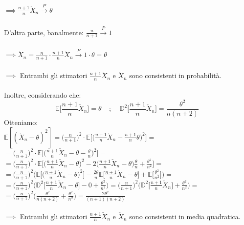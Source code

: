 \documentclass{article}
\begin{document}
$\implies \frac{n+1}{n}\check{X}_{n} \xrightarrow[]{P} \theta$\\ \\
D'altra parte, banalmente: $\frac{n}{n+1} \xrightarrow[]{P} 1$\\ \\
$\implies \check{X}_{n} = \frac{n}{n+1} \cdot \frac{n+1}{n}\check{X}_{n} \xrightarrow[]{P} 1\cdot \theta = \theta$\\ \\
$\implies$ Entrambi gli stimatori $\frac{n+1}{n}\check{X}_{n}$ e $\check{X}_{n}$ sono consistenti in probabilità.\\
\\
Inoltre, considerando che:
\[ \mathbb{E}\Big[\frac{n+1}{n}\check{X}_{n}\Big] = \theta \; \; \; \; ; \; \; \; \; \mathbb{D}^{2}\Big[\frac{n+1}{n}\check{X}_{n}\Big] = \frac{\theta^{2}}{n(n+2)} \]
Otteniamo:\\
$\mathbb{E}[(\check{X}_{n} - \theta)^{2}] = \Big(\frac{n}{n+1}\Big)^{2} \cdot \mathbb{E}\Big[\Big(\frac{n+1}{n}\check{X}_{n} - \frac{n+1}{n}\theta \Big)^{2}\Big] =$\\
$=\Big(\frac{n}{n+1}\Big)^{2} \cdot \mathbb{E}\Big[\Big(\frac{n+1}{n}\check{X}_{n} - \theta - \frac{\theta}{n} \Big)^{2}\Big] =$\\
$=\Big(\frac{n}{n+1}\Big)^{2} \cdot \mathbb{E}\Big[\Big(\frac{n+1}{n}\check{X}_{n} - \theta \Big)^{2} - 2\Big(\frac{n+1}{n}\check{X}_{n} - \theta \Big)\frac{\theta}{n} + \frac{\theta^{2}}{n^{2}} \Big] =$\\
$=\Big(\frac{n}{n+1}\Big)^{2} \Big(\mathbb{E}\Big[\Big(\frac{n+1}{n}\check{X}_{n} - \theta \Big)^{2}\Big] - \frac{2\theta}{n} \mathbb{E}\Big[\frac{n+1}{n}\check{X}_{n} - \theta \Big] + \mathbb{E}\Big[\frac{\theta^{2}}{n^{2}}\Big]\Big) =$\\
$=\Big(\frac{n}{n+1}\Big)^{2} \Big(\mathbb{D}^{2}\Big[\frac{n+1}{n}\check{X}_{n} - \theta \Big] - 0 + \frac{\theta^{2}}{n^{2}}\Big) = \Big(\frac{n}{n+1}\Big)^{2} \Big(\mathbb{D}^{2}\Big[\frac{n+1}{n}\check{X}_{n}\Big] + \frac{\theta^{2}}{n^{2}}\Big) =$\\
$=\Big(\frac{n}{n+1}\Big)^{2} \Big(\frac{\theta^{2}}{n(n+2)} + \frac{\theta^{2}}{n^{2}}\Big) = \frac{2\theta^{2}}{(n+1)(n+2)}$\\ \\
$\implies$ Entrambi gli stimatori $\frac{n+1}{n}\check{X}_{n}$ e $\check{X}_{n}$ sono consistenti in media quadratica.
\end{document}
